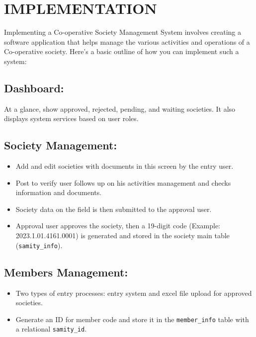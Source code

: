 \section{IMPLEMENTATION}
Implementing a Co-operative Society Management System involves creating a software 
application that helps manage the various activities and operations of a Co-operative society. 
Here's a basic outline of how you can implement such a system:

\subsection{Dashboard:}
At a glance, show approved, rejected, pending, and waiting societies. It also displays system services based on user roles.

\subsection{Society Management:}
\begin{itemize}
    \item Add and edit societies with documents in this screen by the entry user.
    \item Post to verify user follows up on his activities management and checks information and documents.
    \item Society data on the field is then submitted to the approval user.
    \item Approval user approves the society, then a 19-digit code (Example: 2023.1.01.4161.0001) is generated and stored in the society main table (\texttt{samity\_info}).
\end{itemize}

\subsection{Members Management:}
\begin{itemize}
    \item Two types of entry processes: entry system and excel file upload for approved societies.
    \item Generate an ID for member code and store it in the \texttt{member\_info} table with a relational \texttt{samity\_id}.
\end{itemize}

